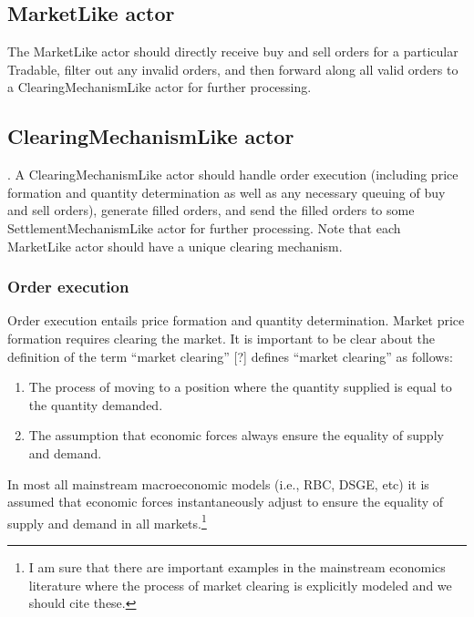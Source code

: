 \documentclass[11pt]{amsart}
\begin{document}
\subsection{MarketLike actor} The MarketLike actor should directly receive buy and sell orders for a particular Tradable, filter out any invalid orders, and then forward along all valid orders to a ClearingMechanismLike actor for further processing.

\subsection{ClearingMechanismLike actor}. A ClearingMechanismLike actor should handle order execution (including price formation and quantity determination as well as any necessary queuing of buy and sell orders), generate filled orders, and send the filled orders to some SettlementMechanismLike actor for further processing. Note that each MarketLike actor should have a unique clearing mechanism.

\subsubsection{Order execution} Order execution entails price formation and quantity determination. Market price formation requires clearing the market. It is important to be clear about the definition of the term ``market clearing'' [?] defines ``market clearing'' as follows:
\begin{enumerate}
    \item The process of moving to a position where the quantity supplied is equal to the quantity demanded.
    \item The assumption that economic forces always ensure the equality of supply and demand.
\end{enumerate}
In most all mainstream macroeconomic models (i.e., RBC, DSGE, etc) it is assumed that economic forces instantaneously adjust to ensure the equality of supply and demand in all markets.\footnote{
%
I am sure that there are important examples in the mainstream economics literature where the process
of market clearing is explicitly modeled and we should cite these.
%
}
\end{document}
